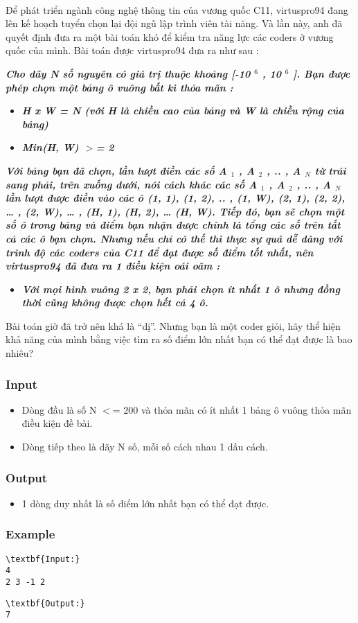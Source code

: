 

 

Để phát triển ngành công nghệ thông tin của vương quốc C11, virtuspro94 đang lên kế hoạch tuyển chọn lại đội ngũ lập trình viên tài năng. Và lần này, anh đã quyết định đưa ra một bài toán khó để kiểm tra năng lực các coders ở vương quốc của mình. Bài toán được virtuspro94 đưa ra như sau :

\emph{\textbf{Cho dãy N số nguyên có giá trị thuộc khoảng [-10 $^ 6 $ , 10 $^ 6 $ ]. Bạn được phép chọn một bảng ô vuông bất kì thỏa mãn : }}
\begin{itemize}
	\item \emph{\textbf{H x W = N (với H là chiều cao của bảng và W là chiều rộng của bảng) }}
	\item \emph{\textbf{Min(H, W) $>$= 2 }}
\end{itemize}

\emph{\textbf{Với bảng bạn đã chọn, lần lượt điền các số A $_ 1 $ , A $_ 2 $ , .. , A $_ N $ từ trái sang phải, trên xuống dưới, nói cách khác các số A $_ 1 $ , A $_ 2 $ , .. , A $_ N $ lần lượt được điền vào các ô (1, 1), (1, 2), .. , (1, W), (2, 1), (2, 2), … , (2, W), … , (H, 1), (H, 2), … (H, W). Tiếp đó, bạn sẽ chọn một số ô trong bảng và điểm bạn nhận được chính là tổng các số trên tất cả các ô bạn chọn. Nhưng nếu chỉ có thế thì thực sự quá dễ dàng với trình độ các coders của C11 để đạt được số điểm tốt nhất, nên virtuspro94 đã đưa ra 1 điều kiện oái oăm : }}
\begin{itemize}
	\item \emph{\textbf{Với mọi hình vuông 2 x 2, bạn phải chọn ít nhất 1 ô nhưng đồng thời cũng không được chọn hết cả 4 ô. }}
\end{itemize}

Bài toán giờ đã trở nên khá là “dị”. Nhưng bạn là một coder giỏi, hãy thể hiện khả năng của mình bằng việc tìm ra số điểm lớn nhất bạn có thể đạt được là bao nhiêu?

\subsubsection{Input}
\begin{itemize}
	\item Dòng đầu là số N $<$= 200 và thỏa mãn có ít nhất 1 bảng ô vuông thỏa mãn điều kiện đề bài.
	\item Dòng tiếp theo là dãy N số, mỗi số cách nhau 1 dấu cách.
\end{itemize}

\subsubsection{Output}
\begin{itemize}
	\item 1 dòng duy nhất là số điểm lớn nhất bạn có thể đạt được.
\end{itemize}

\subsubsection{Example}
\begin{verbatim}
\textbf{Input:}
4
2 3 -1 2\end{verbatim}
\begin{verbatim}
\textbf{Output:}
7\end{verbatim}